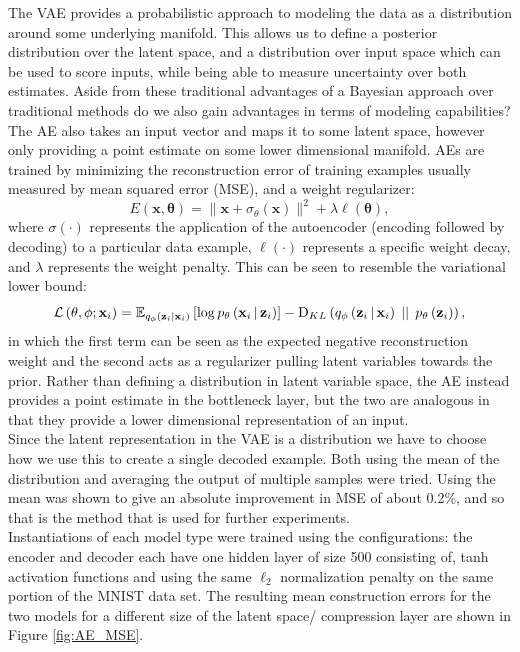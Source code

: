 \documentclass[../report/report.tex]{subfiles}
\begin{document}
The VAE provides a probabilistic approach to modeling the data as a distribution around some underlying manifold. This allows us to define a posterior distribution over the latent space, and a distribution over input space which can be used to score inputs, while being able to measure uncertainty over both estimates. Aside from these traditional advantages of a Bayesian approach over traditional methods do we also gain advantages in terms of modeling capabilities?\\
The AE also takes an input vector and maps it to some latent space, however only providing a point estimate on some lower dimensional manifold. AEs are trained by minimizing the reconstruction error of training examples usually measured by mean squared error (MSE), and a weight regularizer:
\begin{equation}
E(\mathbf{x, \theta}) = \lVert \mathbf{x} + \sigma_\theta(\mathbf{x})\rVert^2 + \lambda \ell(\mathbf{\theta}),
\end{equation}
where $\sigma(\cdot)$ represents the application of the autoencoder (encoding followed by decoding) to a particular data example, $\ell(\cdot)$ represents a specific weight decay, and $\lambda$ represents the weight penalty. This can be seen to resemble the variational lower bound:
\begin{equation}
\mathcal{L} \left( \mathbf{\theta}, \phi; \mathbf{x}_i\right)=\mathbb{E}_{q_\phi \left( \mathbf{z}_i|\mathbf{x}_i\right)} \left[ \log p_\mathbf{\theta} \left(\mathbf{x}_i \, \middle\vert \, \mathbf{z}_i \right) \right] - \textrm{D}_{KL} \left( q_\phi \left(\mathbf{z}_i \, \middle\vert \, \mathbf{x}_i \right) \, \mid \mid \, p_\mathbf{\theta} \left( \mathbf{z}_i\right)\right),
\end{equation}
in which the first term can be seen as the expected negative reconstruction weight and the second  acts as a regularizer pulling latent variables towards the prior. Rather than defining a distribution in latent variable space, the AE instead provides a point estimate in the bottleneck layer, but the two are analogous in that they provide a lower dimensional representation of an input.\\
Since the latent representation in the VAE is a distribution we have to choose how we use this to create a single decoded example. Both using the mean of the distribution and averaging the output of multiple samples were tried. Using the mean was shown to give an absolute improvement in MSE of about 0.2\%, and so that is the method that is used for further experiments.\\
Instantiations of each model type were trained using the configurations: the encoder and decoder each have one hidden layer of size 500 consisting of, tanh activation functions and using the same $\ell_2$ normalization penalty on the same portion of the MNIST data set. The resulting mean construction errors for the two models for a different size of the latent space/ compression layer are shown in Figure \ref{fig:AE_MSE}.
\end{document}
